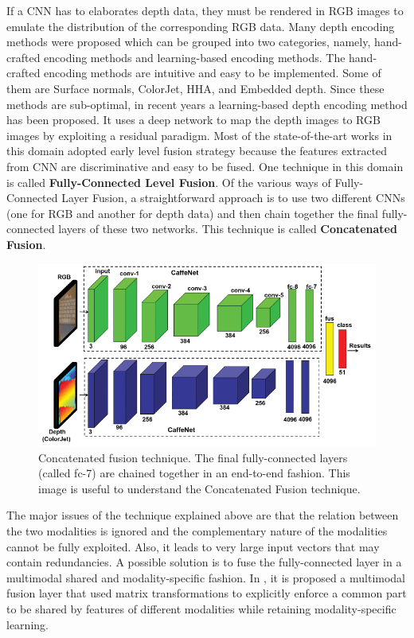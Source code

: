 If a CNN has to elaborates depth data, they must be rendered in RGB images to emulate the distribution of the
corresponding RGB data. Many depth encoding methods were proposed which can be grouped into
two categories, namely, hand-crafted encoding methods and
learning-based encoding methods. The hand-crafted encoding methods are intuitive and easy to be implemented. Some of them are Surface normals, ColorJet, HHA, and Embedded depth. Since these methods are sub-optimal, in recent years a learning-based depth encoding method has been proposed. It uses a deep network to map the depth images to RGB images by exploiting a residual paradigm. Most of the state-of-the-art works in this domain adopted early
level fusion strategy because the features extracted from CNN are discriminative and easy to be fused. One technique in this domain is called \textbf{Fully-Connected Level Fusion}. Of the various ways of Fully-Connected Layer Fusion,
a straightforward approach is to use two different CNNs (one for RGB and another for depth data) and then chain together the final fully-connected layers of these two networks. This technique is called \textbf{Concatenated Fusion}.

\begin{figure}[h!]
	\centering
	\includegraphics[width=0.8\linewidth]{images/cnn_merged_fcl.png}
	\caption{Concatenated fusion technique. The final fully-connected layers (called fc-7) are chained together in an end-to-end fashion. This image is useful to understand the Concatenated Fusion technique. }
\end{figure} 

The major issues of the technique explained above are that the relation between the two modalities is ignored
and the complementary nature of the modalities cannot be fully exploited. Also, it leads to very large input vectors that may contain redundancies. A possible solution is to fuse the fully-connected layer in a multimodal shared and modality-specific fashion. In \cite{75b99ea2e5664bf3842099e1f5f7ca63}, it is proposed a multimodal fusion layer that used matrix transformations to explicitly enforce a common part to be shared by features of different modalities while retaining modality-specific learning.

